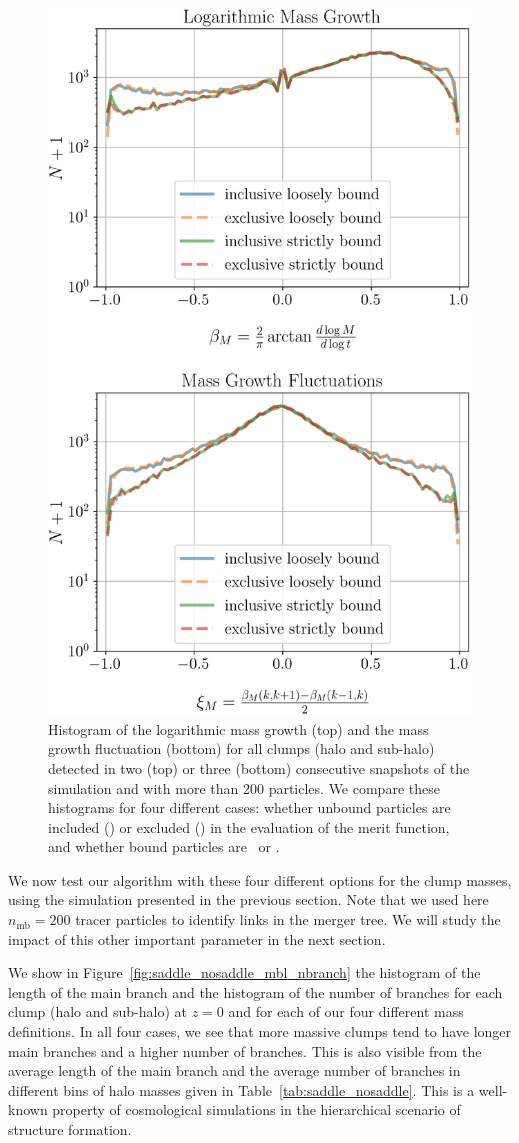 \begin{figure}
  \centering
  \includegraphics[width=.6\linewidth, keepaspectratio]
	{figures/ACACIA/tree-statistics-my-threshold/mass-statistics-inc-excl.png}%
  \caption{Histogram of the logarithmic mass growth (top) and the mass
    growth fluctuation (bottom) for all clumps (halo and sub-halo)
    detected in two (top) or three (bottom) consecutive snapshots of
    the simulation and with more than 200 particles. We compare these
    histograms for four different cases: whether unbound particles are
    included (\inc) or excluded (\exc) in the evaluation of the merit
    function, and whether bound particles are \nosad\ or \sad.
  }%
  \label{fig:saddle_nosaddle_masses}
\end{figure}



We now test our algorithm with these four different options for the clump
masses, using the simulation presented in the previous section. Note
that we used here $n_{\mathrm{mb}}=200$ tracer particles to identify links
in the merger tree. We will study the impact of this other important
parameter in the next section.

We show in Figure~\ref{fig:saddle_nosaddle_mbl_nbranch} the histogram
of the length of the main branch and the histogram of the number of
branches for each clump (halo and sub-halo) at $z=0$ and for each of
our four different mass definitions. In all four cases, we see that more
massive clumps tend to have longer main branches and a higher number
of branches.  This is also visible from the average length of the main
branch and the average number of branches in different bins of halo
masses given in Table~\ref{tab:saddle_nosaddle}. This is a well-known
property of cosmological simulations in the hierarchical scenario of
structure formation.

